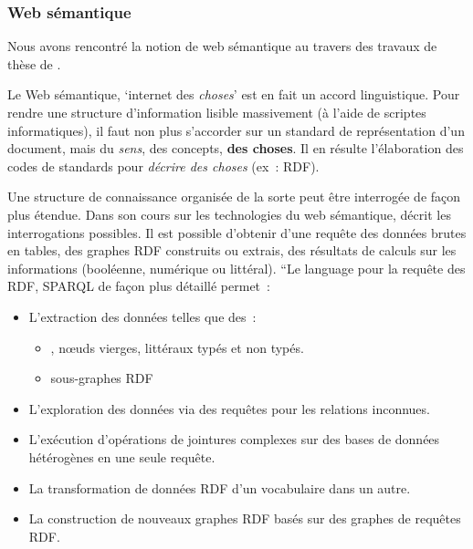\subsubsection{Web sémantique}
Nous avons rencontré la notion de web sémantique au travers des travaux de thèse de \citeauthor{davis_making_2012}. %

Le Web sémantique, `internet des \textit{choses}' est en fait un accord linguistique.
Pour rendre une structure d'information lisible massivement (à l'aide de scriptes informatiques), il faut non plus s'accorder sur un standard de représentation d'un document, mais du \emph{sens}, des concepts, \textbf{des choses}.
Il en résulte l'élaboration des codes de standards pour \emph{décrire des choses} (ex~: \gls{RDF}).

Une structure de connaissance organisée de la sorte peut être interrogée de façon plus étendue.
Dans son cours sur les technologies du web sémantique, \citeauthor{sack_openhpi_2013} décrit les interrogations possibles.
Il est possible d'obtenir d'une requête des données brutes en tables, des graphes \gls{RDF} construits ou extrais, des résultats de calculs sur les informations (booléenne, numérique ou littéral).
``Le language pour la requête des \gls{RDF}, \gls{SPARQL} de façon plus détaillé permet~:
\begin{itemize}
	\item L'extraction des données telles que des~:
		\begin{itemize}
		\item {}, nœuds vierges, littéraux typés et non typés.
		\item sous-graphes \gls{RDF}
		\end{itemize}
	\item L'exploration des données via des requêtes pour les relations inconnues.
	\item L'exécution d'opérations de jointures complexes sur des
	bases de données hétérogènes en une seule requête.
	\item La transformation de données \gls{RDF} d'un vocabulaire dans un autre.
	\item La construction de nouveaux graphes \gls{RDF} basés sur des graphes de requêtes \gls{RDF}.
\end{itemize}


